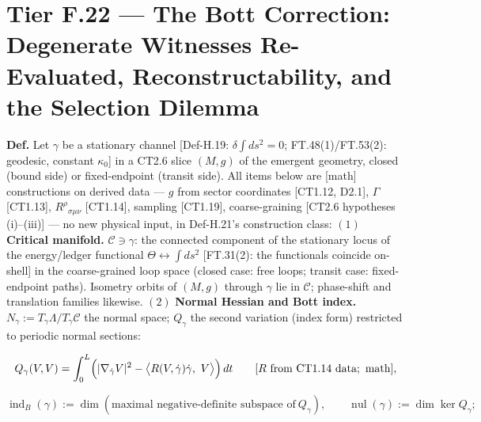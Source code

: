 \section[Tier F.22 — The Bott Correction: Degenerate Witnesses…]{\texorpdfstring{Tier F.22 — The Bott Correction: Degenerate Witnesses Re-Evaluated, Reconstructability, and the Selection Dilemma}{Tier F.22 - The Bott Correction: Degenerate Witnesses Re-Evaluated, Reconstructability, and the Selection Dilemma}}

\begin{definition}\label{tag:Def-H-24}
\textbf{Def.} Let $\gamma$ be a stationary channel [Def-H.19: $\delta\!\int ds^2=0$; FT.48(1)/FT.53(2): geodesic, constant $\kappa_0$] in a CT2.6 slice $(M,g)$ of the emergent geometry, closed (bound side) or fixed-endpoint (transit side). All items below are [math] constructions on derived data — $g$ from sector coordinates [CT1.12, D2.1], $\Gamma$ [CT1.13], $R^\rho{}_{\sigma\mu\nu}$ [CT1.14], sampling [CT1.19], coarse-graining [CT2.6 hypotheses (i)–(iii)] — no new physical input, in Def-H.21's construction class: $(1)$ \textbf{Critical manifold.} $\mathcal C\ni\gamma$: the connected component of the stationary locus of the energy/ledger functional $\Theta\leftrightarrow\int ds^2$ [FT.31(2): the functionals coincide on-shell] in the coarse-grained loop space (closed case: free loops; transit case: fixed-endpoint paths). Isometry orbits of $(M,g)$ through $\gamma$ lie in $\mathcal C$; phase-shift and translation families likewise. $(2)$ \textbf{Normal Hessian and Bott index.} $N_\gamma:=T_\gamma\Lambda/T_\gamma\mathcal C$ the normal space; $Q_\gamma$ the second variation (index form) restricted to periodic normal sections:

\[
Q_\gamma(V,V)=\int_0^L\Bigl(|\nabla_{\dot\gamma}V|^2-\bigl\langle R(V,\dot\gamma)\dot\gamma,\ V\bigr\rangle\Bigr)\,dt\qquad[R\ \text{from CT1.14 data};\ \text{math}],
\]

\[
\operatorname{ind}_B(\gamma):=\dim(\text{maximal negative-definite subspace of}\ Q_\gamma),\qquad\operatorname{nul}(\gamma):=\dim\ker Q_\gamma;
\]


\end{definition}
